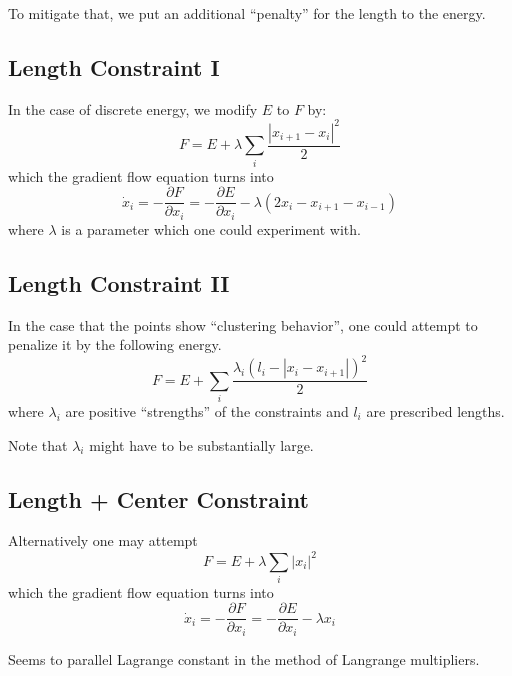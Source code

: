 \documentclass[a4paper, 11pt]{article}
\theoremstyle{definition}
\theoremstyle{remark}
\begin{document}
To mitigate that, we put an additional ``penalty'' for the length to the energy.
\subsection{Length Constraint I}
In the case of discrete energy, we modify $E$ to $F$ by:
\begin{equation}
    F = E + \lambda \sum_i \frac{|x_{i+1} - x_i|^2}{2}
\end{equation}
which the gradient flow equation turns into
\begin{equation}
    \dot{x}_i = - \frac{\partial F}{\partial x_i} =  - \frac{\partial E}{\partial x_i} - \lambda \left( 2 x_i - x_{i+1} - x_{i-1} \right)
\end{equation}
where $\lambda$ is a parameter which one could experiment with.

\subsection{Length Constraint II}
In the case that the points show ``clustering behavior'', one could attempt to penalize it by the following energy.
\begin{equation}
    F = E + \sum_i \frac{\lambda_i \left( l_i - |x_i - x_{i+1}| \right)^2}{2}
\end{equation}
where $\lambda_i$ are positive ``strengths'' of the constraints and $l_i$ are prescribed lengths.

Note that $\lambda_i$ might have to be substantially large.


\subsection{Length + Center Constraint}
Alternatively one may attempt
\begin{equation}
    F = E + \lambda \sum_i |x_i|^2
\end{equation}
which the gradient flow equation turns into
\begin{equation}
    \dot{x}_i = - \frac{\partial F}{\partial x_i} =  - \frac{\partial E}{\partial x_i} - \lambda x_i
\end{equation}



Seems to parallel Lagrange constant in the method of Langrange multipliers.
\end{document}
